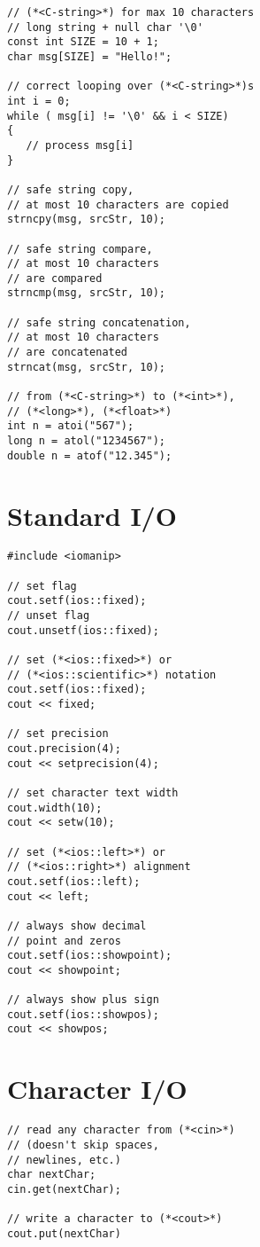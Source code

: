 \documentclass[10pt]{article}
\begin{document}
\begin{multicols*}{3}
\begin{lstlisting}
// (*<C-string>*) for max 10 characters
// long string + null char '\0'
const int SIZE = 10 + 1;
char msg[SIZE] = "Hello!";

// correct looping over (*<C-string>*)s
int i = 0;
while ( msg[i] != '\0' && i < SIZE)
{
   // process msg[i]
}

// safe string copy,
// at most 10 characters are copied
strncpy(msg, srcStr, 10);

// safe string compare,
// at most 10 characters
// are compared
strncmp(msg, srcStr, 10);

// safe string concatenation,
// at most 10 characters 
// are concatenated
strncat(msg, srcStr, 10);

// from (*<C-string>*) to (*<int>*),
// (*<long>*), (*<float>*)
int n = atoi("567");
long n = atol("1234567");
double n = atof("12.345");
\end{lstlisting}
%
%
\section*{Standard I/O}
\small
\begin{lstlisting}
#include <iomanip>

// set flag
cout.setf(ios::fixed);
// unset flag
cout.unsetf(ios::fixed);

// set (*<ios::fixed>*) or 
// (*<ios::scientific>*) notation
cout.setf(ios::fixed);
cout << fixed;

// set precision
cout.precision(4);
cout << setprecision(4);

// set character text width
cout.width(10);
cout << setw(10);

// set (*<ios::left>*) or
// (*<ios::right>*) alignment
cout.setf(ios::left);
cout << left;

// always show decimal
// point and zeros
cout.setf(ios::showpoint);
cout << showpoint;

// always show plus sign
cout.setf(ios::showpos);
cout << showpos;
\end{lstlisting}
%
%
\section*{Character I/O}
\small
\begin{lstlisting}
// read any character from (*<cin>*)
// (doesn't skip spaces, 
// newlines, etc.)
char nextChar;
cin.get(nextChar);

// write a character to (*<cout>*)
cout.put(nextChar)


\end{lstlisting}
\end{multicols*}
\end{document}
